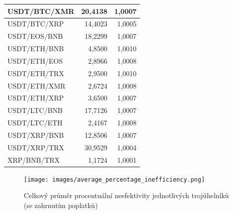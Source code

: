 \documentclass[thesis=B,czech]{FITthesis}[2019/03/21]
\begin{document}
\begin{table}
\begin{tabular}{|| l | r | r ||}
 \hline USDT/BTC/XMR & 20,4138 & 1,0007\\ 
 \hline USDT/BTC/XRP & 14,4023 & 1,0005\\ 
 \hline USDT/EOS/BNB & 18,2299 & 1,0007\\ 
 \hline USDT/ETH/BNB & 4,8500 & 1,0010\\ 
 \hline USDT/ETH/EOS & 2,8966 & 1,0008\\ 
 \hline USDT/ETH/TRX & 2,9500 & 1,0010\\ 
 \hline USDT/ETH/XMR & 2,6724 & 1,0008\\ 
 \hline USDT/ETH/XRP & 3,6500 & 1,0007\\ 
 \hline USDT/LTC/BNB & 17,7126 & 1,0007\\ 
 \hline USDT/LTC/ETH & 2,4167 & 1,0008\\ 
 \hline USDT/XRP/BNB & 12,8506 & 1,0007\\ 
 \hline USDT/XRP/TRX & 30,9529 & 1,0004\\ 
 \hline XRP/BNB/TRX & 1,1724 & 1,0001\\ 
 \hline
\end{tabular}
\end{table}

\begin{figure}\centering
	\texttt{[image: images/average\_percentage\_inefficiency.png]}
	\caption{Celkový průměr procentuální neefektivity jednotlivých trojúhelníků (se zahrnutím poplatků)}\label{average_percentage_inefficiency}
\end{figure}
\end{document}
